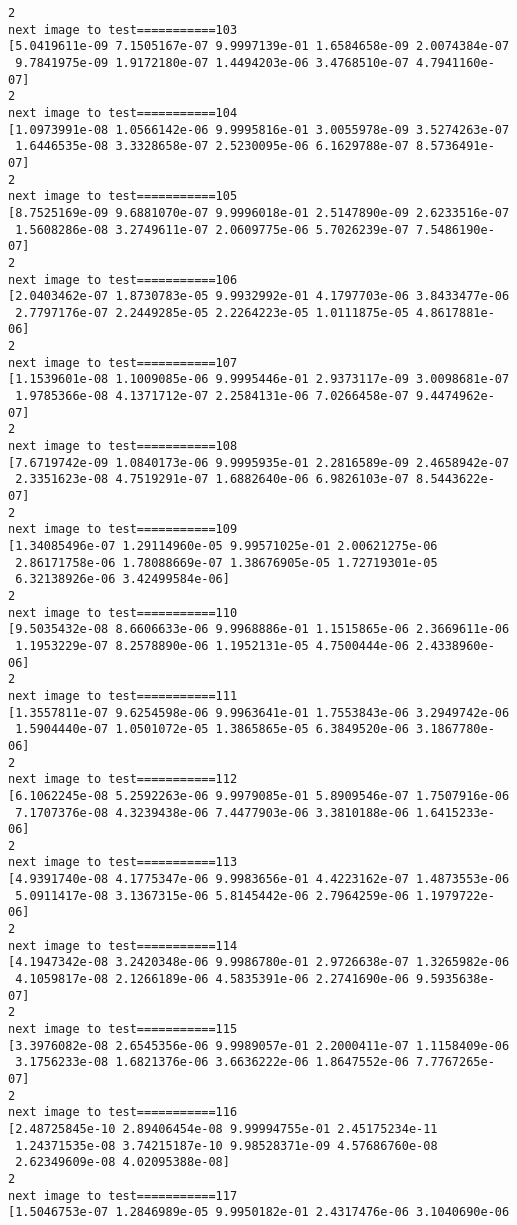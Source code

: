 \documentclass[11pt]{article}
\begin{document}
\begin{Verbatim}[commandchars=\\\{\}]
2
next image to test===========103
[5.0419611e-09 7.1505167e-07 9.9997139e-01 1.6584658e-09 2.0074384e-07
 9.7841975e-09 1.9172180e-07 1.4494203e-06 3.4768510e-07 4.7941160e-07]
2
next image to test===========104
[1.0973991e-08 1.0566142e-06 9.9995816e-01 3.0055978e-09 3.5274263e-07
 1.6446535e-08 3.3328658e-07 2.5230095e-06 6.1629788e-07 8.5736491e-07]
2
next image to test===========105
[8.7525169e-09 9.6881070e-07 9.9996018e-01 2.5147890e-09 2.6233516e-07
 1.5608286e-08 3.2749611e-07 2.0609775e-06 5.7026239e-07 7.5486190e-07]
2
next image to test===========106
[2.0403462e-07 1.8730783e-05 9.9932992e-01 4.1797703e-06 3.8433477e-06
 2.7797176e-07 2.2449285e-05 2.2264223e-05 1.0111875e-05 4.8617881e-06]
2
next image to test===========107
[1.1539601e-08 1.1009085e-06 9.9995446e-01 2.9373117e-09 3.0098681e-07
 1.9785366e-08 4.1371712e-07 2.2584131e-06 7.0266458e-07 9.4474962e-07]
2
next image to test===========108
[7.6719742e-09 1.0840173e-06 9.9995935e-01 2.2816589e-09 2.4658942e-07
 2.3351623e-08 4.7519291e-07 1.6882640e-06 6.9826103e-07 8.5443622e-07]
2
next image to test===========109
[1.34085496e-07 1.29114960e-05 9.99571025e-01 2.00621275e-06
 2.86171758e-06 1.78088669e-07 1.38676905e-05 1.72719301e-05
 6.32138926e-06 3.42499584e-06]
2
next image to test===========110
[9.5035432e-08 8.6606633e-06 9.9968886e-01 1.1515865e-06 2.3669611e-06
 1.1953229e-07 8.2578890e-06 1.1952131e-05 4.7500444e-06 2.4338960e-06]
2
next image to test===========111
[1.3557811e-07 9.6254598e-06 9.9963641e-01 1.7553843e-06 3.2949742e-06
 1.5904440e-07 1.0501072e-05 1.3865865e-05 6.3849520e-06 3.1867780e-06]
2
next image to test===========112
[6.1062245e-08 5.2592263e-06 9.9979085e-01 5.8909546e-07 1.7507916e-06
 7.1707376e-08 4.3239438e-06 7.4477903e-06 3.3810188e-06 1.6415233e-06]
2
next image to test===========113
[4.9391740e-08 4.1775347e-06 9.9983656e-01 4.4223162e-07 1.4873553e-06
 5.0911417e-08 3.1367315e-06 5.8145442e-06 2.7964259e-06 1.1979722e-06]
2
next image to test===========114
[4.1947342e-08 3.2420348e-06 9.9986780e-01 2.9726638e-07 1.3265982e-06
 4.1059817e-08 2.1266189e-06 4.5835391e-06 2.2741690e-06 9.5935638e-07]
2
next image to test===========115
[3.3976082e-08 2.6545356e-06 9.9989057e-01 2.2000411e-07 1.1158409e-06
 3.1756233e-08 1.6821376e-06 3.6636222e-06 1.8647552e-06 7.7767265e-07]
2
next image to test===========116
[2.48725845e-10 2.89406454e-08 9.99994755e-01 2.45175234e-11
 1.24371535e-08 3.74215187e-10 9.98528371e-09 4.57686760e-08
 2.62349609e-08 4.02095388e-08]
2
next image to test===========117
[1.5046753e-07 1.2846989e-05 9.9950182e-01 2.4317476e-06 3.1040690e-06

\end{Verbatim}
\end{document}
